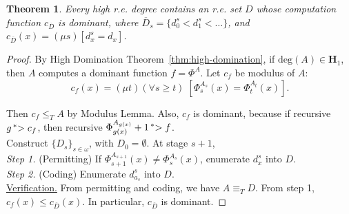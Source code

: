 \documentclass{article}
\newtheorem{theorem}{Theorem}[subsection]
\begin{document}
  \begin{theorem}
    Every high r.e. degree contains an r.e. set $D$ whose computation
    function $c_{\overline{D}}$ is dominant, where $\overline{D}_s
    =\{d_0^s<d_1^s<\ldots\}$, and $c_{\overline{D}}(x) =(\mu
    s)[d_x^s=d_x]$.
    \label{thm:high-dominant}
  \end{theorem}
  \begin{proof}
    By High Domination Theorem~\ref{thm:high-domination}, if
    $\text{deg}(A)\in\bm{H}_1$, then $A$ computes a dominant function
    $f=\Phi^A$. Let $c_f$ be modulus of $A$:
    \[c_f(x) =(\mu t) (\forall s\geq t)\; [\Phi_s^{A_s}(x)
    =\Phi_t^{A_t}(x)].\]

    Then $c_f\leq_T A$ by Modulus Lemma. Also, $c_f$ is dominant, because
    if recursive $g\prescript{*}{}{>}\; c_f$, then recursive
    $\Phi_{g(x)}^{A_{g(x)}}+1 \prescript{*}{}{>}\; f$. \\

    Construct $\{D_s\}_{s\in\omega}$, with $D_0=\emptyset$. At stage $s+1$,
    \\

    \textit{Step 1.} (Permitting) If $\Phi_{s+1}^{A_{s+1}}(x)
    \neq\Phi_{s}^{A_{s}}(x)$, enumerate $d_x^s$ into $D$. \\

    \textit{Step 2.} (Coding) Enumerate $d_{a_s}^s$ into $D$. \\

    \underline{Verification.} From permitting and coding, we have
    $A\equiv_T D$. From step 1, $c_f(x) \leq c_{\overline{D}}(x)$. In
    particular, $c_{\overline{D}}$ is dominant.
  \end{proof}
\end{document}
